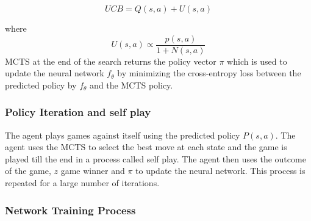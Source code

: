 \begin{equation}
    UCB = Q(s, a) + U(s, a)
\end{equation}

where \[U(s, a) \propto \frac{p(s, a)}{1 + N(s, a)}\] MCTS at the end of the search returns the policy vector \( \pi \) which is used
to update the neural network \( f_\theta \) by minimizing the cross-entropy
loss between the predicted policy by $f_\theta$ and the MCTS policy.

\subsubsection{Policy Iteration and self play}
The agent plays games against itself using the predicted policy $P(s, a)$. The
agent uses the MCTS to select the best move at each state and the game is
played till the end in a process called self play. The agent then uses the
outcome of the game, $z$ game winner and $\pi$ to update the neural network.
This process is repeated for a large number of iterations.

\subsubsection{Network Training Process}

